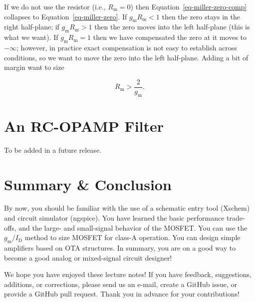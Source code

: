 \documentclass[
  a4paper,
  DIV=11,
  numbers=noendperiod]{scrartcl}
\begin{document}
If we do not use the resistor (i.e., \(R_\mathrm{m}=0\)) then
Equation~\ref{eq-miller-zero-comp} collapses to
Equation~\ref{eq-miller-zero}. If \(g_\mathrm{m}R_\mathrm{m} < 1\) then
the zero stays in the right half-plane; if
\(g_\mathrm{m}R_\mathrm{m} > 1\) then the zero moves into the left
half-plane (this is what we want). If \(g_\mathrm{m}R_\mathrm{m} = 1\)
then we have compensated the zero at it moves to \(-\infty\); however,
in practice exact compensation is not easy to establish across
conditions, so we want to move the zero into the left half-plane. Adding
a bit of margin want to size

\[
R_\mathrm{m} > \frac{2}{g_\mathrm{m}}.
\]

\section{An RC-OPAMP Filter}\label{an-rc-opamp-filter}

To be added in a future release.

\section{Summary \& Conclusion}\label{summary-conclusion}

By now, you should be familiar with the use of a schematic entry tool
(Xschem) and circuit simulator (ngspice). You have learned the basic
performance trade-offs, and the large- and small-signal behavior of the
MOSFET. You can use the \(g_\mathrm{m}/I_\mathrm{D}\) method to size
MOSFET for class-A operation. You can design simple amplifiers based on
OTA structures. In summary, you are on a good way to become a good
analog or mixed-signal circuit designer!

\begin{tcolorbox}[enhanced jigsaw, breakable, opacitybacktitle=0.6, arc=.35mm, coltitle=black, toprule=.15mm, colback=white, leftrule=.75mm, bottomrule=.15mm, left=2mm, colframe=quarto-callout-important-color-frame, colbacktitle=quarto-callout-important-color!10!white, titlerule=0mm, title=\textcolor{quarto-callout-important-color}{\faExclamation}\hspace{0.5em}{Feedback}, rightrule=.15mm, bottomtitle=1mm, toptitle=1mm, opacityback=0]

We hope you have enjoyed these lecture notes! If you have feedback,
suggestions, additions, or corrections, please send us an e-mail, create
a GitHub issue, or provide a GitHub pull request. Thank you in advance
for your contributions!

\end{tcolorbox}
\end{document}
